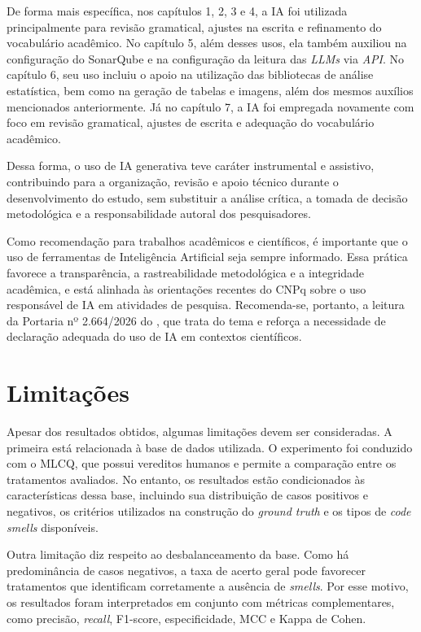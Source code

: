 De forma mais específica, nos capítulos 1, 2, 3 e 4, a IA foi utilizada principalmente para revisão gramatical, ajustes na escrita e refinamento do vocabulário acadêmico. No capítulo 5, além desses usos, ela também auxiliou na configuração do SonarQube e na configuração da leitura das \textit{LLMs} via \textit{API}. No capítulo 6, seu uso incluiu o apoio na utilização das bibliotecas de análise estatística, bem como na geração de tabelas e imagens, além dos mesmos auxílios mencionados anteriormente. Já no capítulo 7, a IA foi empregada novamente com foco em revisão gramatical, ajustes de escrita e adequação do vocabulário acadêmico.

Dessa forma, o uso de IA generativa teve caráter instrumental e assistivo, contribuindo para a organização, revisão e apoio técnico durante o desenvolvimento do estudo, sem substituir a análise crítica, a tomada de decisão metodológica e a responsabilidade autoral dos pesquisadores.

Como recomendação para trabalhos acadêmicos e científicos, é importante que o uso de ferramentas de Inteligência Artificial seja sempre informado. Essa prática favorece a transparência, a rastreabilidade metodológica e a integridade acadêmica, e está alinhada às orientações recentes do CNPq sobre o uso responsável de IA em atividades de pesquisa. Recomenda-se, portanto, a leitura da Portaria nº 2.664/2026 do , que trata do tema e reforça a necessidade de declaração adequada do uso de IA em contextos científicos.

\section{Limitações}

Apesar dos resultados obtidos, algumas limitações devem ser consideradas. A primeira está relacionada à base de dados utilizada. 
O experimento foi conduzido com o MLCQ, que possui vereditos humanos e permite a comparação entre os tratamentos avaliados. 
No entanto, os resultados estão condicionados às características dessa base, incluindo sua distribuição de casos positivos e negativos, 
os critérios utilizados na construção do \textit{ground truth} e os tipos de \textit{code smells} disponíveis.

Outra limitação diz respeito ao desbalanceamento da base. Como há predominância de casos negativos, a taxa de acerto geral 
pode favorecer tratamentos que identificam corretamente a ausência de \textit{smells}. Por esse motivo, os resultados foram 
interpretados em conjunto com métricas complementares, como precisão, \textit{recall}, F1-score, especificidade, MCC e Kappa de Cohen.

